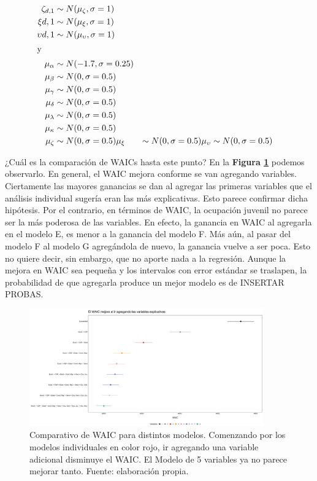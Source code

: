 \begin{align}
\zeta_{d,1} &\sim N(\mu_{\zeta}, \sigma=1) \nonumber \\
\xi{d,1} &\sim N(\mu_{\xi}, \sigma=1) \nonumber \\
\upsilon{d,1} &\sim N(\mu_{\upsilon}, \sigma=1) \nonumber \\
\intertext{y}
\mu_{\alpha} &\sim N(-1.7,\sigma=0.25) \nonumber \\
\mu_{\beta} &\sim N(0,\sigma=0.5) \nonumber \\
\mu_{\gamma} &\sim N(0,\sigma=0.5) \nonumber \\
\mu_{\delta} &\sim N(0,\sigma=0.5) \nonumber \\
\mu_{\lambda} &\sim N(0,\sigma=0.5) \nonumber \\
\mu_{\kappa} &\sim N(0,\sigma=0.5) \nonumber \\
\mu_{\zeta} &\sim N(0,\sigma=0.5) \nonumber
\mu_{\xi} &\sim N(0,\sigma=0.5) \nonumber
\mu_{\upsilon} &\sim N(0,\sigma=0.5) \nonumber
\end{align}

¿Cuál es la comparación de WAICs hasta este punto? En la \textbf{Figura \ref{fig:Compara_WAIC_Compuestos}} podemos observarlo. En general, el WAIC mejora conforme se van agregando variables. Ciertamente las mayores ganancias se dan al agregar las primeras variables que el análisis individual sugería eran las más explicativas. Esto parece confirmar dicha hipótesis. Por el contrario, en términos de WAIC, la ocupación juvenil no parece ser la más poderosa de las variables. En efecto, la ganancia en WAIC al agregarla en el modelo E, es menor a la ganancia del modelo F. Más aún, al pasar del modelo F al modelo G agregándola de nuevo, la ganancia vuelve a ser poca. {\color{Red}Esto no quiere decir, sin embargo, que no aporte nada a la regresión. Aunque la mejora en WAIC sea pequeña y los intervalos con error estándar se traslapen, la probabilidad de que agregarla produce un mejor modelo es de INSERTAR PROBAS.}

\begin{figure}[h]
	\centering
	\includegraphics[width = 0.9\textwidth]{Figs/Modelado/Graf_WAIC_Modelos_Compuestos}
	\caption{Comparativo de WAIC para distintos modelos. Comenzando por los modelos individuales en color rojo, ir agregando una variable adicional disminuye el WAIC. El Modelo de 5 variables ya no parece mejorar tanto. Fuente: elaboración propia.}
	\label{fig:Compara_WAIC_Compuestos}
\end{figure}